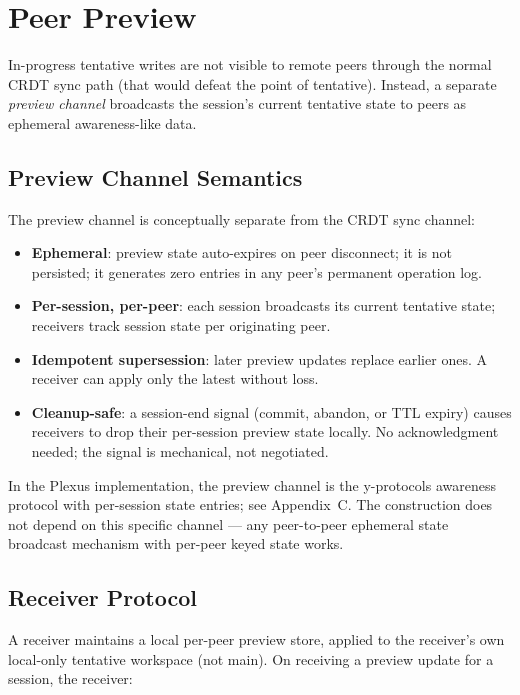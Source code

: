 \section{Peer Preview}

In-progress tentative writes are not visible to remote peers through the normal CRDT sync path (that would defeat the point of tentative). Instead, a separate \emph{preview channel} broadcasts the session's current tentative state to peers as ephemeral awareness-like data.

\subsection{Preview Channel Semantics}

The preview channel is conceptually separate from the CRDT sync channel:

\begin{itemize}
    \item \textbf{Ephemeral}: preview state auto-expires on peer disconnect; it is not persisted; it generates zero entries in any peer's permanent operation log.
    \item \textbf{Per-session, per-peer}: each session broadcasts its current tentative state; receivers track session state per originating peer.
    \item \textbf{Idempotent supersession}: later preview updates replace earlier ones. A receiver can apply only the latest without loss.
    \item \textbf{Cleanup-safe}: a session-end signal (commit, abandon, or TTL expiry) causes receivers to drop their per-session preview state locally. No acknowledgment needed; the signal is mechanical, not negotiated.
\end{itemize}

In the Plexus implementation, the preview channel is the y-protocols awareness protocol with per-session state entries; see Appendix~C. The construction does not depend on this specific channel --- any peer-to-peer ephemeral state broadcast mechanism with per-peer keyed state works.

\subsection{Receiver Protocol}

A receiver maintains a local per-peer preview store, applied to the receiver's own local-only tentative workspace (not main). On receiving a preview update for a session, the receiver:

